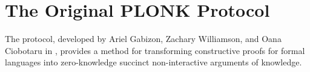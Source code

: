 \begin{comment}
Dave thinks he can outsmart the system, Since he is the last to contribute, he just makes up an entirely new $MPC$ that does not contain any randomness from the previous contributors. He thinks he can do that because, no one can distinguish his $MPC_{1,3}$ from a correct one. If this is done in a smart way, he will even be able to compute the correct $POK$s. 

So Dave choses $s=12$, $\alpha=11$ and $\beta=10$ and he will keep those values, hoping to be able to use them later to forge false proofs in the factorization snark. He then compute  
$$
MPC_{1,3}= \left\{
\begin{array}{lcl}
([s]g_1, [s]g_2) &=& ((13,28),(7v^2,27v^3))\\ 
{}[s^2] g_1 &=& (13,15)\\
{}[\alpha]g_1 &=& (33,9)\\ 
{}[\alpha\cdot s]g_1 &=& (33,34)\\ 
([\beta]g_1,[\beta]g_2) &=& ((38,28),(42v^2,27v^3))\\ 
{}[\beta \cdot s]g_1 &=& (38,15)
\end{array}
\right\}
$$
Dave does not delete $s$, $\alpha$ and $\beta$, because if this is accepted as phase one of the \concept{Common Reference String} computation, Dave controls already $3/4$-th of the cheating key to forge proofs. So Dave is careful to get the proofs of knowledge right. He computes the transcript of Carols contribution as 

\begin{multline*}
transcript_{1,2}=\\ 
MD5('
(26,34)(16v^2,28v^3)(13,28)(13,28)(26,9)(27,34)(17v^2,28v^3)(35,28)') =\\ c8e6308fffd47009f5f65e773ae4b499
\end{multline*}

We obtain that hash by computing

$printf '\%s' "(26,34)(16v^2,28v^3)(13,28)(13,28)(26,9)(27,34)(17v^2,28v^3)(35,28)" | md5sum$

\end{example}
\end{comment}
\section{The Original PLONK Protocol}
\label{sec:PLONK}
The  protocol, developed by Ariel Gabizon, Zachary Williamson, and Oana Ciobotaru in \cite{gabizon-19}, provides a method for transforming constructive proofs for formal languages into zero-knowledge succinct non-interactive arguments of knowledge. 

